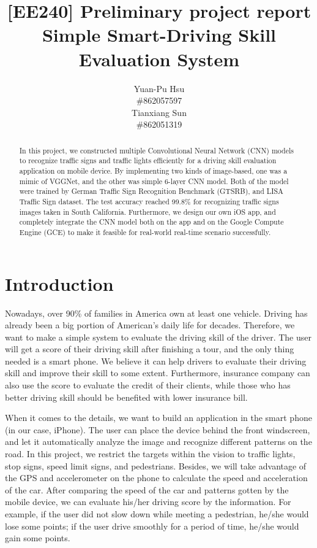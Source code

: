 \documentclass{article}
\title{[EE240] Preliminary project report\\Simple Smart-Driving Skill Evaluation System}
\author{
  Yuan-Pu Hsu \\\#862057597\\
  \And 
  Tianxiang Sun\\\#862051319\\
}
\begin{document}

\maketitle

\begin{abstract}
In this project, we constructed multiple Convolutional Neural Network (CNN) models to  recognize traffic signs and traffic lights efficiently for a driving skill evaluation application on mobile device. By implementing two kinds of image-based, one was a mimic of VGGNet, and the other was simple 6-layer CNN model. Both of the model were trained by German Traffic Sign Recognition Benchmark (GTSRB), and LISA Traffic Sign dataset. The test accuracy reached 99.8\% for recognizing traffic signs images taken in South California. Furthermore, we design our own iOS app, and completely integrate the CNN model both on the app and on the Google Compute Engine (GCE) to make it feasible for real-world real-time scenario successfully. 

\end{abstract}


\section{Introduction}

Nowadays, over 90\% of families in America own at least one vehicle. Driving has already been a big portion of American’s daily life for decades. Therefore, we want to make a simple system to evaluate the driving skill of the driver. The user will get a score of their driving skill after finishing a tour, and the only thing needed is a smart phone. We believe it can help drivers to evaluate their driving skill and improve their skill to some extent. Furthermore, insurance company can also use the score to evaluate the credit of their clients, while those who has better driving skill should be benefited with lower insurance bill.

When it comes to the details, we want to build an application in the smart phone (in our case, iPhone). The user can place the device behind the front windscreen, and let it automatically analyze the image and recognize different patterns on the road. In this project, we restrict the targets within the vision to traffic lights, stop signs, speed limit signs, and pedestrians. Besides, we will take advantage of the GPS and accelerometer on the phone to calculate the speed and acceleration of the car. After comparing the speed of the car and patterns gotten by the mobile device, we can evaluate his/her driving score by the information. For example, if the user did not slow down while meeting a pedestrian, he/she would lose some points; if the user drive smoothly for a period of time, he/she would gain some points.
\end{document}
